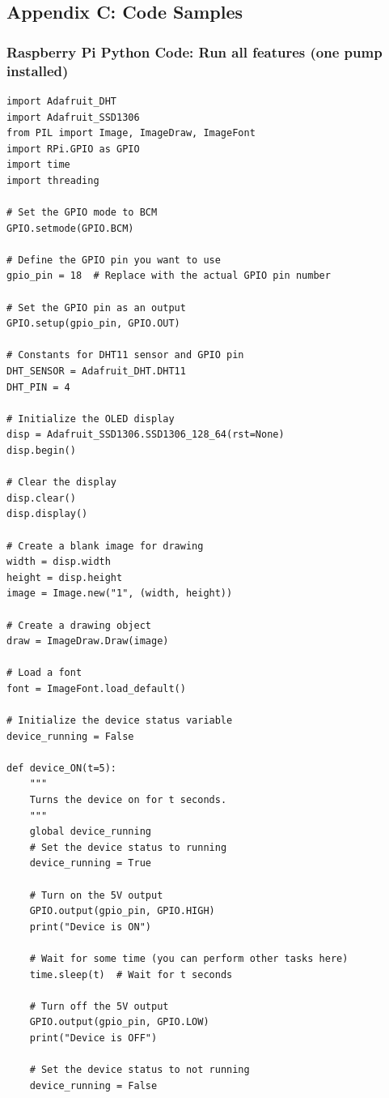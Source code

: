 \documentclass{article}
\begin{document}
	\subsection{Appendix C: Code Samples \label{appendix:code}}
	
		\subsubsection{Raspberry Pi Python Code: Run all features (one pump installed)}
\begin{lstlisting}[style=pythonstyle]
import Adafruit_DHT
import Adafruit_SSD1306
from PIL import Image, ImageDraw, ImageFont
import RPi.GPIO as GPIO
import time
import threading

# Set the GPIO mode to BCM
GPIO.setmode(GPIO.BCM)

# Define the GPIO pin you want to use
gpio_pin = 18  # Replace with the actual GPIO pin number

# Set the GPIO pin as an output
GPIO.setup(gpio_pin, GPIO.OUT)

# Constants for DHT11 sensor and GPIO pin
DHT_SENSOR = Adafruit_DHT.DHT11
DHT_PIN = 4

# Initialize the OLED display
disp = Adafruit_SSD1306.SSD1306_128_64(rst=None)
disp.begin()

# Clear the display
disp.clear()
disp.display()

# Create a blank image for drawing
width = disp.width
height = disp.height
image = Image.new("1", (width, height))

# Create a drawing object
draw = ImageDraw.Draw(image)

# Load a font
font = ImageFont.load_default()

# Initialize the device status variable
device_running = False

def device_ON(t=5):
    """
    Turns the device on for t seconds.
    """
    global device_running
    # Set the device status to running
    device_running = True

    # Turn on the 5V output
    GPIO.output(gpio_pin, GPIO.HIGH)
    print("Device is ON")

    # Wait for some time (you can perform other tasks here)
    time.sleep(t)  # Wait for t seconds

    # Turn off the 5V output
    GPIO.output(gpio_pin, GPIO.LOW)
    print("Device is OFF")

    # Set the device status to not running
    device_running = False


\end{lstlisting}
\end{document}
